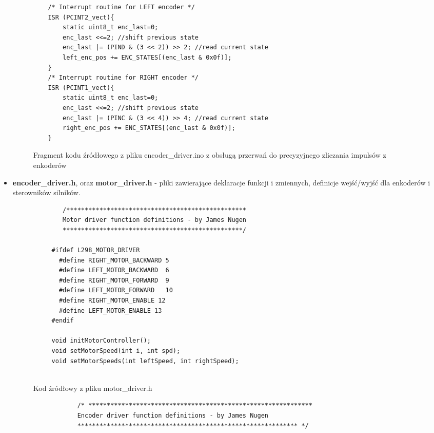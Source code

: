 \documentclass[a4paper,twoside,12pt]{book}
\begin{document}
\begin{itemize}
	

	\begin{figure}[!hb]
		\centering
	\begin{lstlisting}
	/* Interrupt routine for LEFT encoder */
	ISR (PCINT2_vect){
		static uint8_t enc_last=0;	
		enc_last <<=2; //shift previous state
		enc_last |= (PIND & (3 << 2)) >> 2; //read current state
		left_enc_pos += ENC_STATES[(enc_last & 0x0f)];
	}
	/* Interrupt routine for RIGHT encoder */
	ISR (PCINT1_vect){
		static uint8_t enc_last=0;
		enc_last <<=2; //shift previous state
		enc_last |= (PINC & (3 << 4)) >> 4; //read current state
		right_enc_pos += ENC_STATES[(enc_last & 0x0f)];
	}
	\end{lstlisting}
	\caption{Fragment kodu źródłowego z pliku encoder\_driver.ino z obsługą przerwań do precyzyjnego zliczania impulsów z enkoderów}
	\label{fig:encoder-driver2}
	\end{figure}
\newpage
	\item \textbf{encoder\_driver.h}, oraz \textbf{motor\_driver.h} - pliki zawierające deklaracje funkcji i zmiennych, definicje wejść/wyjść dla enkoderów i sterowników silników. 
	\newline

	
	\begin{figure}[!hb]
		\centering
	\begin{lstlisting}
		/*************************************************
		Motor driver function definitions - by James Nugen
		*************************************************/
	 
	 #ifdef L298_MOTOR_DRIVER
	   #define RIGHT_MOTOR_BACKWARD 5
	   #define LEFT_MOTOR_BACKWARD  6
	   #define RIGHT_MOTOR_FORWARD  9
	   #define LEFT_MOTOR_FORWARD   10
	   #define RIGHT_MOTOR_ENABLE 12
	   #define LEFT_MOTOR_ENABLE 13
	 #endif
	 
	 void initMotorController();
	 void setMotorSpeed(int i, int spd);
	 void setMotorSpeeds(int leftSpeed, int rightSpeed);
	 
		\end{lstlisting}
		\caption{Kod źródłowy z pliku motor\_driver.h}
		\label{fig:motor-driver}
		\end{figure}

	

	\begin{figure}[!hb]
		\begin{lstlisting}
			/* *************************************************************
			Encoder driver function definitions - by James Nugen
			************************************************************ */
			

\end{lstlisting}
\end{figure}
\end{itemize}
\end{document}
